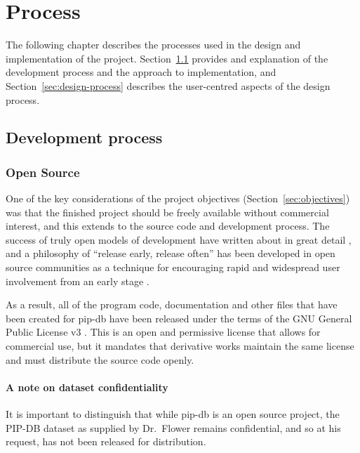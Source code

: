 \chapter{Process}\label{chap:process}
The following chapter describes the processes used in the design and
implementation of the project. Section~\ref{sec:development-process}
provides and explanation of the development process and the approach
to implementation, and Section~\ref{sec:design-process} describes the
user-centred aspects of the design process.

\section{Development process}\label{sec:development-process}


\cite{martin2003agile, highsmith2001agile}


\cite{balduino2007introduction, kroll2006agility}


\subsection{Open Source}\label{subsec:open-source}
One of the key considerations of the project objectives
(Section~\ref{sec:objectives}) was that the finished project should be
freely available without commercial interest, and this extends to the
source code and development process. The success of truly open models
of development have written about in great detail
\cite{weber2004success, godfrey2000evolution, chesbrough2006open,
  von2005democratizing}, and a philosophy of ``release early, release
often'' has been developed in open source communities as a technique
for encouraging rapid and widespread user involvement from an early
stage \cite{raymond1999cathedral}.

As a result, all of the program code, documentation and other files
that have been created for pip-db have been released under the terms
of the GNU General Public License v3 \cite{gnu2007gpl}. This is an
open and permissive license that allows for commercial use, but it
mandates that derivative works maintain the same license and must
distribute the source code openly.


\subsubsection*{A note on dataset confidentiality}
It is important to distinguish that while pip-db is an open source
project, the PIP-DB dataset as supplied by Dr.\ Flower remains
confidential, and so at his request, has not been released for
distribution.


